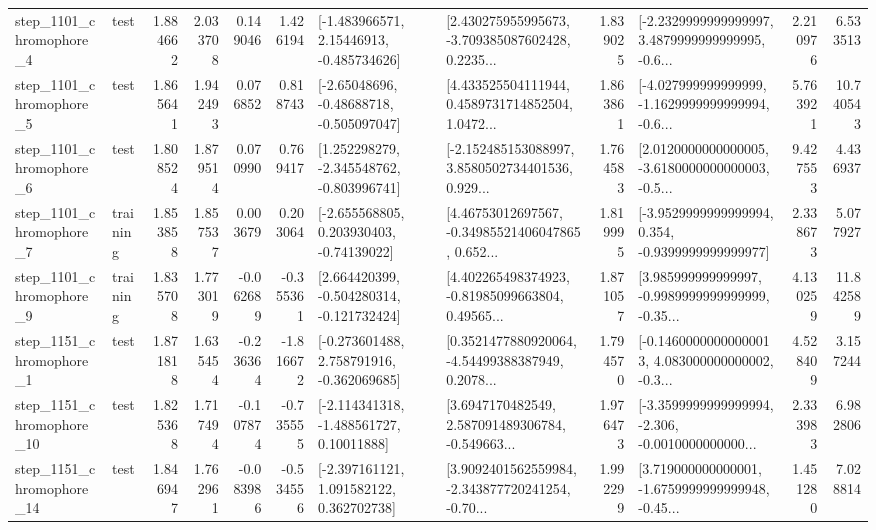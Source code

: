 \begin{tabular}{llrrrrllrlrr}
  step\_1101\_chromophore\_4 &      test &      1.884662 &    2.033708 &      0.149046 &  1.426194 &    [-1.483966571, 2.15446913, -0.485734626] &  [2.430275955995673, -3.709385087602428, 0.2235... &       1.839025 &  [-2.2329999999999997, 3.4879999999999995, -0.6... &            2.210976 &          6.533513 \\
  step\_1101\_chromophore\_5 &      test &      1.865641 &    1.942493 &      0.076852 &  0.818743 &    [-2.65048696, -0.48688718, -0.505097047] &  [4.433525504111944, 0.4589731714852504, 1.0472... &       1.863861 &  [-4.027999999999999, -1.1629999999999994, -0.6... &            5.763921 &         10.740543 \\
  step\_1101\_chromophore\_6 &      test &      1.808524 &    1.879514 &      0.070990 &  0.769417 &   [1.252298279, -2.345548762, -0.803996741] &  [-2.152485153088997, 3.8580502734401536, 0.929... &       1.764583 &  [2.0120000000000005, -3.6180000000000003, -0.5... &            9.427553 &          4.436937 \\
  step\_1101\_chromophore\_7 &  training &      1.853858 &    1.857537 &      0.003679 &  0.203064 &    [-2.655568805, 0.203930403, -0.74139022] &  [4.46753012697567, -0.34985521406047865, 0.652... &       1.819995 &  [-3.9529999999999994, 0.354, -0.9399999999999977] &            2.338673 &          5.077927 \\
  step\_1101\_chromophore\_9 &  training &      1.835708 &    1.773019 &     -0.062689 & -0.355361 &   [2.664420399, -0.504280314, -0.121732424] &  [4.402265498374923, -0.81985099663804, 0.49565... &       1.871057 &  [3.985999999999997, -0.9989999999999999, -0.35... &            4.130259 &         11.842589 \\
  step\_1151\_chromophore\_1 &      test &      1.871818 &    1.635454 &     -0.236364 & -1.816672 &   [-0.273601488, 2.758791916, -0.362069685] &  [0.3521477880920064, -4.54499388387949, 0.2078... &       1.794570 &  [-0.14600000000000013, 4.083000000000002, -0.3... &            4.528409 &          3.157244 \\
 step\_1151\_chromophore\_10 &      test &      1.825368 &    1.717494 &     -0.107874 & -0.735555 &    [-2.114341318, -1.488561727, 0.10011888] &  [3.6947170482549, 2.587091489306784, -0.549663... &       1.976473 &  [-3.3599999999999994, -2.306, -0.0010000000000... &            2.333983 &          6.982806 \\
 step\_1151\_chromophore\_14 &      test &      1.846947 &    1.762961 &     -0.083986 & -0.534556 &    [-2.397161121, 1.091582122, 0.362702738] &  [3.9092401562559984, -2.343877720241254, -0.70... &       1.992299 &  [3.719000000000001, -1.6759999999999948, -0.45... &            1.451280 &          7.028814 \\

\end{tabular}
